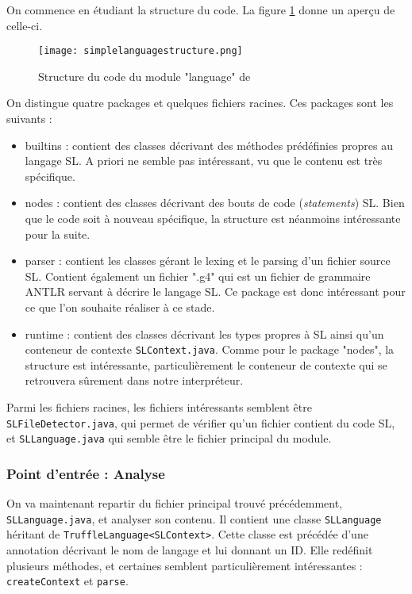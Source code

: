 \documentclass[../report.tex]{subfiles}
\begin{document}
On commence en étudiant la structure du code. La figure \ref{fig:simplelanguagestructure} donne un aperçu de celle-ci.
\begin{figure}[h]
    \centering
    \texttt{[image: simplelanguagestructure.png]}
    \caption{Structure du code du module "language" de \sl{}}
    \label{fig:simplelanguagestructure}
\end{figure}
On distingue quatre packages et quelques fichiers racines. Ces packages sont les suivants :
\begin{itemize}
    \item builtins : contient des classes décrivant des méthodes prédéfinies propres au langage SL. A priori ne semble pas intéressant, vu que le contenu est très spécifique.
    \item nodes : contient des classes décrivant des bouts de code (\textit{statements}) SL. Bien que le code soit à nouveau spécifique, la structure est néanmoins intéressante pour la suite.
    \item parser : contient les classes gérant le lexing et le parsing d'un fichier source SL. Contient également un fichier ".g4" qui est un fichier de grammaire ANTLR servant à décrire le langage SL. Ce package est donc intéressant pour ce que l'on souhaite réaliser à ce stade.
    \item runtime :  contient des classes décrivant les types propres à SL ainsi qu'un conteneur de contexte \texttt{SLContext.java}. Comme pour le package "nodes", la structure est intéressante, particulièrement le conteneur de contexte qui se retrouvera sûrement dans notre interpréteur.
\end{itemize}
Parmi les fichiers racines, les fichiers intéressants semblent être \texttt{SLFileDetector.java}, qui permet de vérifier qu'un fichier contient du code SL, et \texttt{SLLanguage.java} qui semble être le fichier principal du module.
\subsubsection{Point d'entrée : Analyse}
\label{subsubsec:entrypoint}
On va maintenant repartir du fichier principal trouvé précédemment, \texttt{SLLanguage.java}, et analyser son contenu. Il contient une classe \texttt{SLLanguage} héritant de \texttt{TruffleLanguage<SLContext>}. Cette classe est précédée d'une annotation décrivant le nom de langage et lui donnant un ID. Elle redéfinit plusieurs méthodes, et certaines semblent particulièrement intéressantes : \texttt{createContext} et \texttt{parse}.
\end{document}
